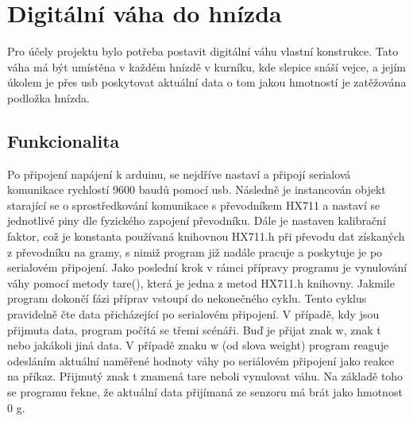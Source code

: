 \section{Digitální váha do hnízda}\label{sec:digitalni-vaha-do-hnizda}
Pro účely projektu bylo potřeba postavit digitální váhu vlastní konstrukce.
Tato váha má být umístěna v každém hnízdě v kurníku, kde slepice snáší vejce, a jejím úkolem je přes usb poskytovat aktuální data o tom jakou hmotností je zatěžována podložka hnízda.

\subsection*{Funkcionalita}
Po připojení napájení k arduinu, se nejdříve nastaví a připojí serialová komunikace rychlostí 9600 baudů pomocí usb.
Následně je instancován objekt starající se o sprostředkování komunikace s převodníkem HX711 a nastaví se jednotlivé piny dle fyzického zapojení převodníku.
Dále je nastaven kalibrační faktor, což je konstanta používaná knihovnou HX711.h při převodu dat získaných z převodníku na gramy, s nimiž program již nadále pracuje a poskytuje je po serialovém připojení.
Jako poslední krok v rámci přípravy programu je vynulování váhy pomocí metody tare(), která je jedna z metod HX711.h knihovny.
Jakmile program dokončí fázi příprav vstoupí do nekonečného cyklu.
Tento cyklus pravidelně čte data přicházející po serialovém připojení.
V případě, kdy jsou přijmuta data, program počítá se třemi scénáři.
Buď je přijat znak w, znak t nebo jakákoli jiná data.
V případě znaku w (od slova weight) program reaguje odesláním aktuální naměřené hodnoty váhy po seriálovém připojení jako reakce na příkaz.
Přijmutý znak t znamená tare neboli vynulovat váhu.
Na základě toho se programu řekne, že aktuální data přijímaná ze senzoru má brát jako hmotnost 0 g.


